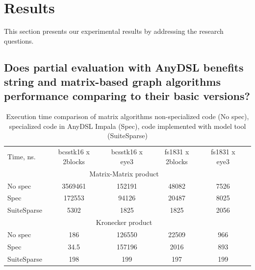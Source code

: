 \documentclass[conference]{IEEEtran}
\begin{document}
\section{Results}
This section presents our experimental results by addressing the research questions.

\subsection{Does partial evaluation with AnyDSL benefits string and matrix-based graph algorithms performance comparing to their basic versions?}


\begin{table}[!h]
\begin{tabular}{lccccc}

		Time, ns.   & bcsstk16 x 2blocks & bcsstk16 x eye3 & fs1831 x 2blocks & fs1831 x eye3 \\
		\multicolumn{5}{c}{Matrix-Matrix product}                                             \\
		No spec     & 3569461            & 152191          & 48082            & 7526          \\
		Spec        & 172553             & 94126           & 20487            & 8025          \\
		SuiteSparse & 5302               & 1825            & 1825             & 2056          \\
		\multicolumn{5}{c}{Kronecker product}                                                 \\
		No spec     & 186                & 126550          & 22509            & 966           \\
		Spec        & 34.5               & 157196          & 2016             & 893           \\
		SuiteSparse & 198                & 199             & 197              & 199          
\end{tabular}
\centering
\caption{Execution time comparison of matrix algorithms non-specialized code (No spec),\\ specialized code in AnyDSL Impala (Spec), code implemented with model tool (SuiteSparse)}
\label{table_graph}
\end{table}
\end{document}
